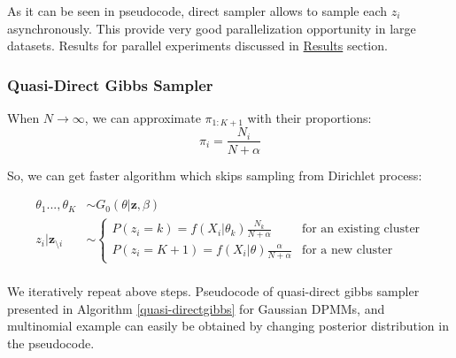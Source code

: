 \documentclass[a4paper]{article}
\begin{document}
As it can be seen in pseudocode, direct sampler allows to sample each
\(z_i\) asynchronously. This provide very good parallelization
opportunity in large datasets. Results for parallel experiments
discussed in \protect\hyperlink{ux20Results}{Results} section.

\subsubsection{Quasi-Direct Gibbs Sampler}

When $N \rightarrow \infty$, we can approximate $\pi_{1:K+1}$ with their proportions:
$$\pi_i = \frac{N_i}{N+\alpha}$$

So, we can get faster algorithm which skips sampling from Dirichlet process:

\begin{align*}
\theta_1...,\theta_K&\sim G_0(\theta|\boldsymbol z, \beta) \\
z_i|\boldsymbol z_{\setminus i} &\sim \begin{cases}
P(z_i=k)= f(X_i|\theta_{k})\frac{N_k}{N+\alpha} & \text{for an existing cluster} \\
P(z_i=K+1)= f(X_i|\theta)\frac{\alpha}{N+\alpha} & \text{for a new cluster}
\end{cases}\\
\end{align*}

We iteratively repeat above steps. Pseudocode of quasi-direct gibbs sampler presented in Algorithm \ref{quasi-directgibbs} for Gaussian DPMMs, and multinomial example
can easily be obtained by changing posterior distribution in the
pseudocode.
\end{document}
